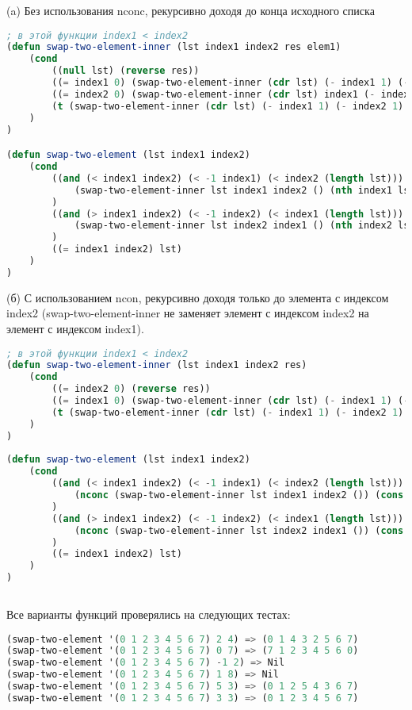 \documentclass[12pt]{report}
\begin{document}
(a) Без использования nconc, рекурсивно доходя до конца исходного списка
\begin{lstlisting}[language=Lisp]
; в этой функции index1 < index2
(defun swap-two-element-inner (lst index1 index2 res elem1)
	(cond 
		((null lst) (reverse res))
		((= index1 0) (swap-two-element-inner (cdr lst) (- index1 1) (- index2 1) (cons (nth index2 lst) res) elem1))
		((= index2 0) (swap-two-element-inner (cdr lst) index1 (- index2 1) (cons elem1 res) elem1))
		(t (swap-two-element-inner (cdr lst) (- index1 1) (- index2 1) (cons (car lst) res) elem1))
	)
)

(defun swap-two-element (lst index1 index2)
	(cond 
		((and (< index1 index2) (< -1 index1) (< index2 (length lst)))
			(swap-two-element-inner lst index1 index2 () (nth index1 lst))
		)
		((and (> index1 index2) (< -1 index2) (< index1 (length lst)))
			(swap-two-element-inner lst index2 index1 () (nth index2 lst))
		)
		((= index1 index2) lst)
	)
)
\end{lstlisting}
\clearpage
(б) С использованием ncon, рекурсивно доходя только до элемента с индексом index2 (swap-two-element-inner не заменяет элемент с индексом index2  на элемент с индексом index1). 

\begin{lstlisting}[language=Lisp]
; в этой функции index1 < index2
(defun swap-two-element-inner (lst index1 index2 res)
	(cond 
		((= index2 0) (reverse res))
		((= index1 0) (swap-two-element-inner (cdr lst) (- index1 1) (- index2 1) (cons (nth index2 lst) res)))
		(t (swap-two-element-inner (cdr lst) (- index1 1) (- index2 1) (cons (car lst) res)))
	)
)
	
(defun swap-two-element (lst index1 index2)
	(cond 
		((and (< index1 index2) (< -1 index1) (< index2 (length lst)))
			(nconc (swap-two-element-inner lst index1 index2 ()) (cons (nth index1 lst) (nthcdr (+ index2 1) lst)))
		)
		((and (> index1 index2) (< -1 index2) (< index1 (length lst)))
			(nconc (swap-two-element-inner lst index2 index1 ()) (cons (nth index2 lst) (nthcdr (+ index1 1) lst)))
		)
		((= index1 index2) lst)
	)
)
	
\end{lstlisting}

Все варианты функций проверялись на следующих тестах:
\begin{lstlisting}[language=Lisp]
(swap-two-element '(0 1 2 3 4 5 6 7) 2 4) => (0 1 4 3 2 5 6 7)
(swap-two-element '(0 1 2 3 4 5 6 7) 0 7) => (7 1 2 3 4 5 6 0)
(swap-two-element '(0 1 2 3 4 5 6 7) -1 2) => Nil
(swap-two-element '(0 1 2 3 4 5 6 7) 1 8) => Nil
(swap-two-element '(0 1 2 3 4 5 6 7) 5 3) => (0 1 2 5 4 3 6 7)
(swap-two-element '(0 1 2 3 4 5 6 7) 3 3) => (0 1 2 3 4 5 6 7)
\end{lstlisting}
\end{document}

